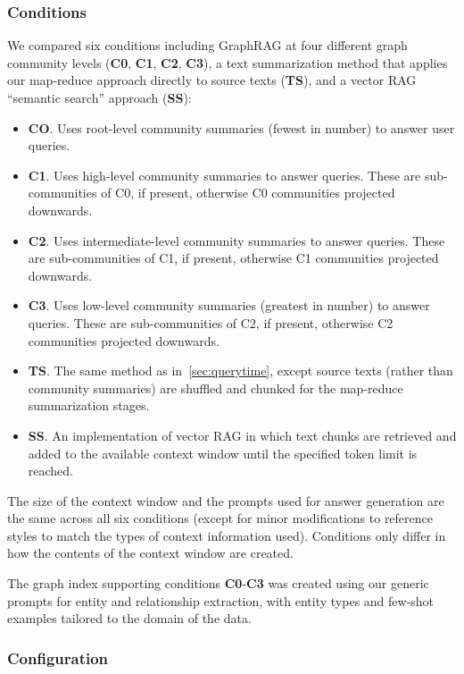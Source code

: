 \documentclass{article}
\begin{document}
\subsubsection{Conditions}

We compared six conditions including GraphRAG at four different graph community levels (\textbf{C0}, \textbf{C1}, \textbf{C2}, \textbf{C3}), a text summarization method that applies our map-reduce approach directly to source texts (\textbf{TS}), and a vector RAG ``semantic search'' approach (\textbf{SS}):

\begin{itemize}
\item \textbf{CO}. Uses root-level community summaries (fewest in number) to answer user queries.
\item \textbf{C1}. Uses high-level community summaries to answer queries. These are sub-communities of C0, if present, otherwise C0 communities projected downwards.
\item \textbf{C2}. Uses intermediate-level community summaries to answer queries. These are sub-communities of C1, if present, otherwise C1 communities projected downwards.
\item \textbf{C3}. Uses low-level community summaries (greatest in number) to answer queries. These are sub-communities of C2, if present, otherwise C2 communities projected downwards.
\item \textbf{TS}. The same method as in~\autoref{sec:querytime}, except source texts (rather than community summaries) are shuffled and chunked for the map-reduce summarization stages.
\item \textbf{SS}. An implementation of vector RAG in which text chunks are retrieved and added to the available context window until the specified token limit is reached.
\end{itemize}

The size of the context window and the prompts used for answer generation are the same across all six conditions (except for minor modifications to reference styles to match the types of context information used).
Conditions only differ in how the contents of the context window are created.

The graph index supporting conditions \textbf{C0}-\textbf{C3} was created using our generic prompts for entity and relationship extraction, with entity types and few-shot examples tailored to the domain of the data. 

\subsubsection{Configuration}
\end{document}
